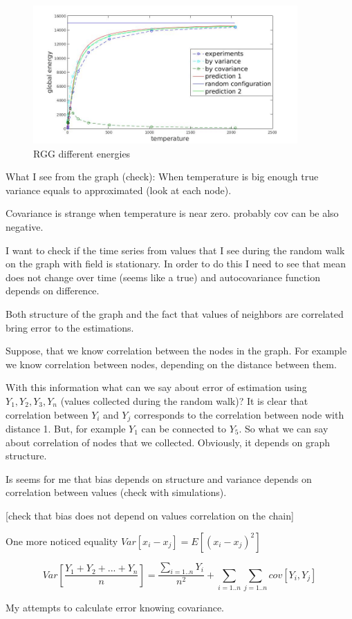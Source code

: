 \documentclass[12pt]{report}
\begin{document}
\begin{figure}[ht]
    \centering
    \includegraphics[height=200px]{rggEnergy}
    \caption{RGG different energies}
\end{figure}

What I see from the graph (check):
When temperature is big enough true variance equals to approximated (look at each node).

Covariance is strange when temperature is near zero. probably cov can be also negative.


I want to check if the time series from values that I see during the random walk on the graph with field is stationary. In order to do this I need to see that mean does not change over time (seems like a true) and autocovariance function depends on difference.




Both structure of the graph and the fact that values of neighbors are correlated bring error to the estimations.

Suppose, that we know correlation between the nodes in the graph. For example we know correlation between nodes, depending on the distance between them.

With this information what can we say about error of estimation using $Y_1, Y_2, Y_3, Y_n$ (values collected during the random walk)? It is clear that correlation between $Y_i$ and $Y_j$ corresponds to the correlation between node with distance 1. But, for example $Y_1$ can be connected to $Y_5$. So what we can say about correlation of nodes that we collected. Obviously, it depends on graph structure.

Is seems for me that bias depends on structure and variance depends on correlation between values (check with simulations).

[check that bias does not depend on values correlation on the chain]


One more noticed equality $Var[x_i - x_j] = E[(x_i-x_j)^2]$




$$ Var\left[\frac{Y_1 + Y_2 + ... + Y_n}{n}\right] = \frac{\sum\limits_{i=1..n} Y_i}{n^2} + \sum\limits_{i=1..n} \sum\limits_{j=1..n} cov[Y_i, Y_j]
$$



My attempts to calculate error knowing covariance.
\end{document}
